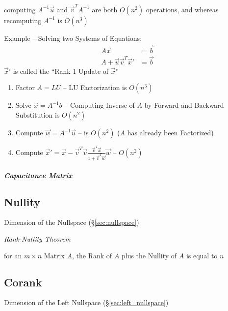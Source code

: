 computing $A^{-1}\vec{u}$ and $\vec{v}^TA^{-1}$ are both $O(n^2)$ operations,
and whereas recomputing $A^{-1}$ is $O(n^3)$

\asterism

Example -- Solving two Systems of Equations:
\begin{align*}
  A\vec{x}                     & = \vec{b} \\
  A + \vec{u}\vec{v}^T\vec{x}' & = \vec{b}
\end{align*}
$\vec{x}'$ is called the ``Rank 1 Update of $\vec{x}$''

\begin{enumerate}
  \item Factor $A = LU$ -- LU Factorization is $O(n^3)$
  \item Solve $\vec{x} = A^{-1}b$ -- Computing Inverse of $A$ by Forward and
    Backward Substitution is $O(n^2)$
  \item Compute $\vec{w} = A^{-1}\vec{u}$ -- is $O(n^2)$ ($A$ has already been
    Factorized)
  \item Compute
    $\vec{x}' = \vec{x} - \vec{v}^T\vec{v}
      \frac{\vec{v}^T\vec{x}}{1 + \vec{v}^T\vec{w}} \vec{w}$ -- $O(n^2)$
\end{enumerate}



\subparagraph{Capacitance Matrix}\label{sec:capacitance_matrix}\hfill



\subsection{Nullity}\label{sec:nullity}

Dimension of the Nullspace (\S\ref{sec:nullspace})

\emph{Rank-Nullity Theorem}

for an $m \times n$ Matrix $A$, the Rank of $A$ plus the Nullity of $A$ is
equal to $n$



\subsection{Corank}\label{sec:corank}

Dimension of the Left Nullspace (\S\ref{sec:left_nullspace})



